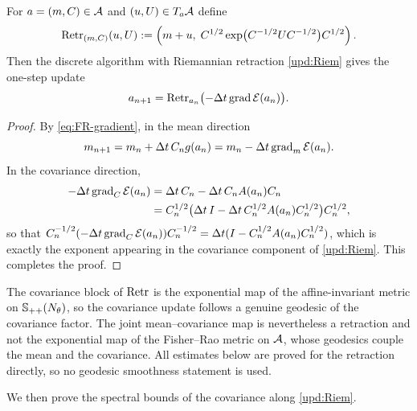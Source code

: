 \begin{proposition}\label{prop:upd-map-Riem}
    For $a=(m,C)\in\mathcal{A}$ and $(u,U)\in T_a\mathcal{A}$ define
    \begin{equation*}
        \operatorname{Retr}_{(m,C)}(u,U)
        :=
        \left(m+u,\;C^{1/2}\exp\bigl(C^{-1/2}UC^{-1/2}\bigr)C^{1/2}\right).
    \end{equation*}
    Then the discrete algorithm with Riemannian retraction \eqref{upd:Riem} gives the one-step
    update
    \begin{equation*}
        a_{n+1}=\operatorname{Retr}_{a_n}\bigl(-\Delta t\operatorname{grad}\mathcal{E}(a_n)\bigr).
    \end{equation*}
\end{proposition}

\begin{proof}
    By \eqref{eq:FR-gradient}, in the mean direction
    \begin{equation*}
        m_{n+1}=m_n+\Delta t\,C_ng(a_n)=m_n-\Delta t\operatorname{grad}_m\mathcal{E}(a_n).
    \end{equation*}
    In the covariance direction,
    \begin{align*}
        -\Delta t\operatorname{grad}_C\mathcal{E}(a_n)
        &=\Delta t\,C_n-\Delta t\,C_nA(a_n)C_n\\
        &=C_n^{1/2}\bigl(\Delta t\,I-\Delta t\,C_n^{1/2}A(a_n)C_n^{1/2}\bigr)C_n^{1/2},
    \end{align*}
    so that $C_n^{-1/2}(-\Delta t\operatorname{grad}_C\mathcal{E}(a_n))C_n^{-1/2}
    =\Delta t(I-C_n^{1/2}A(a_n)C_n^{1/2})$, which is exactly the exponent appearing in the
    covariance component of \eqref{upd:Riem}. This completes the proof.
\end{proof}

\begin{remark}\label{rem:Riem-retr}
    The covariance block of $\operatorname{Retr}$ is the exponential map of the affine-invariant metric on
    $\mathbb{S}_{++}(N_\theta)$, so the covariance update follows a genuine geodesic of the covariance
    factor. The joint mean--covariance map is nevertheless a retraction and not the exponential
    map of the Fisher--Rao metric on $\mathcal{A}$, whose geodesics couple the mean and the
    covariance. All estimates below are proved for the retraction directly, so no geodesic
    smoothness statement is used.
\end{remark}

We then prove the spectral bounds of the covariance along \eqref{upd:Riem}.

